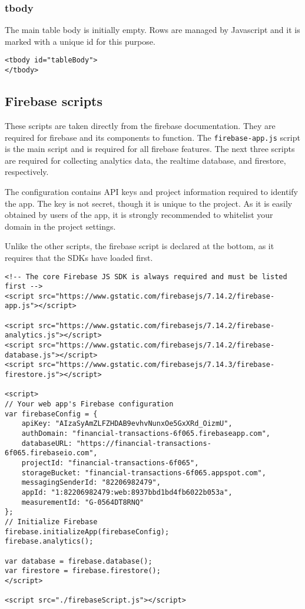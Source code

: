 \documentclass[letterpaper]{article}
\begin{document}
\subsubsection{tbody}

The main table body is initially empty.
Rows are managed by Javascript and it is marked with a unique id for this purpose.
\begin{lstlisting}[firstnumber=317]
<tbody id="tableBody">
</tbody>
\end{lstlisting}

\subsection{Firebase scripts}

These scripts are taken directly from the firebase documentation.
They are required for firebase and its components to function.
The \lstinline{firebase-app.js} script is the main script and is required for all firebase features.
The next three scripts are required for collecting analytics data, the realtime database, and firestore, respectively.

The configuration contains API keys and project information required to identify the app.
The key is not secret, though it is unique to the project.
As it is easily obtained by users of the app, it is strongly recommended to whitelist your domain in the project settings.

Unlike the other scripts, the firebase script is declared at the bottom, as it requires that the SDKs have loaded first.
\begin{lstlisting}[firstnumber=323]
<!-- The core Firebase JS SDK is always required and must be listed first -->
<script src="https://www.gstatic.com/firebasejs/7.14.2/firebase-app.js"></script>

<script src="https://www.gstatic.com/firebasejs/7.14.2/firebase-analytics.js"></script>
<script src="https://www.gstatic.com/firebasejs/7.14.2/firebase-database.js"></script>
<script src="https://www.gstatic.com/firebasejs/7.14.3/firebase-firestore.js"></script>

<script>
// Your web app's Firebase configuration
var firebaseConfig = {
    apiKey: "AIzaSyAmZLFZHDAB9evhvNunxOe5GxXRd_OizmU",
    authDomain: "financial-transactions-6f065.firebaseapp.com",
    databaseURL: "https://financial-transactions-6f065.firebaseio.com",
    projectId: "financial-transactions-6f065",
    storageBucket: "financial-transactions-6f065.appspot.com",
    messagingSenderId: "82206982479",
    appId: "1:82206982479:web:8937bbd1bd4fb6022b053a",
    measurementId: "G-0564DT8RNQ"
};
// Initialize Firebase
firebase.initializeApp(firebaseConfig);
firebase.analytics();

var database = firebase.database();
var firestore = firebase.firestore();
</script>

<script src="./firebaseScript.js"></script>
\end{lstlisting}
\end{document}
